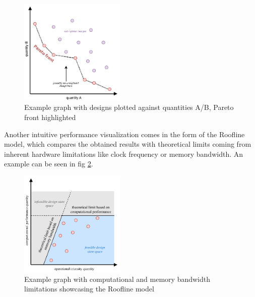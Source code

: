 \begin{figure}[hpt!]
  \centering
  \includegraphics[trim={0cm 0cm 0cm 0cm}, width=0.45\textwidth, center]{background/pareto.pdf}
  \caption{Example graph with designs plotted against quantities A/B, Pareto front highlighted}
  \label{fig:pareto}
\end{figure}

Another intuitive performance visualization comes in the form of the Roofline model, which compares the obtained results with theoretical limits coming from inherent hardware limitations like clock frequency or memory bandwidth. An example can be seen in fig \ref{fig:roofline}.

\begin{figure}[hpt!]
  \centering
  \includegraphics[trim={0cm 0cm 0cm 0cm}, width=0.45\textwidth, center]{background/roofline.pdf}
  \caption{Example graph with computational and memory bandwidth limitations showcasing the Roofline model}
  \label{fig:roofline}
\end{figure}


